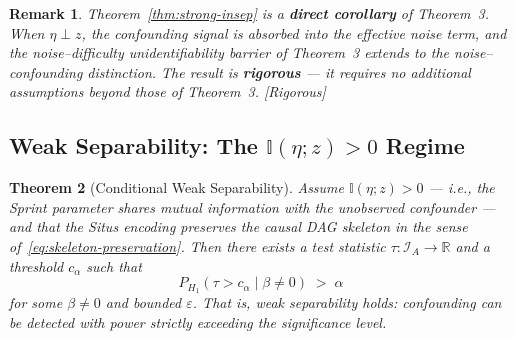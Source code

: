 \documentclass[12pt,a4paper]{article}
\newtheorem{theorem}{Theorem}[section]
\newtheorem{remark}[theorem]{Remark}
\newcommand{\rigorous}{\textcolor{green!50!black}{\small\textsf{[Rigorous]}}}
\newcommand{\R}{\mathbb{R}}
\newcommand{\I}{\mathbb{I}}
\newcommand{\cI}{\mathcal{I}}
\begin{document}
\begin{remark}
Theorem~\ref{thm:strong-insep} is a \textbf{direct corollary} of Theorem~3.
When $\eta \perp z$, the confounding signal is absorbed into the effective
noise term, and the noise--difficulty unidentifiability barrier of Theorem~3
extends to the noise--confounding distinction.  The result is \textbf{rigorous}
— it requires no additional assumptions beyond those of Theorem~3.  \rigorous
\end{remark}

\subsection{Weak Separability: The $\I(\eta; z) > 0$ Regime}
\label{sec:weak}

\begin{theorem}[Conditional Weak Separability]
\label{thm:weak-sep}
Assume $\I(\eta; z) > 0$ — i.e., the Sprint parameter shares mutual information
with the unobserved confounder — and that the Situs encoding preserves the
causal DAG skeleton in the sense of~\eqref{eq:skeleton-preservation}.  Then
there exists a test statistic $\tau: \cI_A \to \R$ and a threshold $c_\alpha$
such that
\begin{equation}\label{eq:weak-sep-power}
    P_{H_1}(\tau > c_\alpha \mid \beta \neq 0) \;>\; \alpha
\end{equation}
for some $\beta \neq 0$ and bounded $\varepsilon$.  That is, weak separability
holds: confounding can be detected with power strictly exceeding the
significance level.
\end{theorem}
\end{document}
